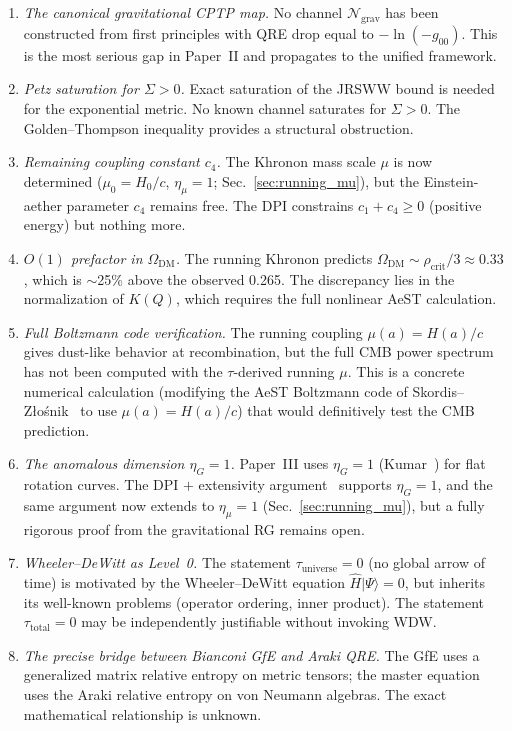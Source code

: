 \documentclass[prd,twocolumn,superscriptaddress,longbibliography,floatfix]{revtex4-2}
\newcommand{\chan}{\mathcal{N}}
\newcommand{\tauasym}{\tau}
\newcommand{\OmDM}{\Omega_{\mathrm{DM}}}
\begin{document}
\begin{enumerate}
\item \emph{The canonical gravitational CPTP map.}
  No channel $\chan_{\mathrm{grav}}$ has been
  constructed from first principles with QRE drop
  equal to $-\ln(-g_{00})$.  This is the most serious
  gap in Paper~II and propagates to the unified
  framework.

\item \emph{Petz saturation for $\Sigma > 0$.}
  Exact saturation of the JRSWW bound is needed for
  the exponential metric.  No known channel saturates
  for $\Sigma > 0$.  The Golden--Thompson inequality
  provides a structural obstruction.

\item \emph{Remaining coupling constant $c_4$.}
  The Khronon mass scale $\mu$ is now determined
  ($\mu_0 = H_0/c$, $\eta_\mu = 1$;
  Sec.~\ref{sec:running_mu}), but the Einstein-aether
  parameter $c_4$ remains free.  The DPI constrains
  $c_1 + c_4 \geq 0$ (positive energy) but nothing
  more.

\item \emph{$O(1)$ prefactor in $\OmDM$.}
  The running Khronon predicts
  $\OmDM \sim \rho_{\mathrm{crit}}/3 \approx 0.33$,
  which is $\sim$25\% above the observed 0.265.  The
  discrepancy lies in the normalization of $K(Q)$,
  which requires the full nonlinear AeST calculation.

\item \emph{Full Boltzmann code verification.}
  The running coupling $\mu(a) = H(a)/c$ gives
  dust-like behavior at recombination, but the full
  CMB power spectrum has not been computed with the
  $\tauasym$-derived running $\mu$.  This is a
  concrete numerical calculation (modifying the AeST
  Boltzmann code of
  Skordis--Z\l{}o\'{s}nik~\cite{SkordisZlosnik2021}
  to use $\mu(a) = H(a)/c$) that would definitively
  test the CMB prediction.

\item \emph{The anomalous dimension $\eta_G = 1$.}
  Paper~III uses $\eta_G = 1$ (Kumar~\cite{Kumar2025})
  for flat rotation curves.  The DPI $+$ extensivity
  argument~\cite{Paper3} supports $\eta_G = 1$, and
  the same argument now extends to $\eta_\mu = 1$
  (Sec.~\ref{sec:running_mu}), but a fully rigorous
  proof from the gravitational RG remains open.

\item \emph{Wheeler--DeWitt as Level~0.}
  The statement $\tauasym_{\mathrm{universe}} = 0$
  (no global arrow of time) is motivated by the
  Wheeler--DeWitt equation $\hat{H}|\Psi\rangle = 0$,
  but inherits its well-known problems (operator
  ordering, inner product).  The statement
  $\tauasym_{\mathrm{total}} = 0$ may be
  independently justifiable without invoking WDW.

\item \emph{The precise bridge between Bianconi GfE
  and Araki QRE.}
  The GfE uses a generalized matrix relative entropy
  on metric tensors; the master equation uses the
  Araki relative entropy on von Neumann algebras.
  The exact mathematical relationship is unknown.
\end{enumerate}
\end{document}
